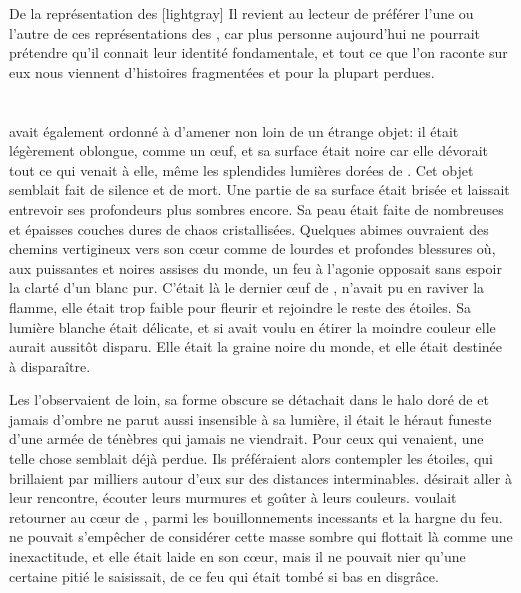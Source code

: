 \begin{paperbox}{De la représentation des \Ea}[lightgray]
Il revient au lecteur de préférer l'une ou l'autre de ces représentations des \Ea, car plus personne aujourd'hui ne pourrait prétendre qu'il connait leur identité fondamentale, et tout ce que l'on raconte sur eux nous viennent d'histoires fragmentées et pour la plupart perdues. 
\end{paperbox}

    

\section{\Orba}

\Cind avait également ordonné à \Carac d'amener non loin de \Naos un étrange objet: il était légèrement oblongue, comme un œuf, et sa surface était noire car elle dévorait tout ce qui venait à elle, même les splendides lumières dorées de \Naos. Cet objet semblait fait de silence et de mort. Une partie de sa surface était brisée et laissait entrevoir ses profondeurs plus sombres encore. Sa peau était faite de nombreuses et épaisses couches dures de chaos cristallisées. %
Quelques abimes ouvraient des chemins vertigineux vers son cœur comme de lourdes et profondes blessures où, aux puissantes et noires assises du monde, un feu à l'agonie opposait sans espoir la clarté d'un blanc pur. C'était là le dernier œuf de \Tot, \Carac n'avait pu en raviver la flamme, elle était trop faible pour fleurir et rejoindre le reste des étoiles. Sa lumière blanche était délicate, et si \Carac avait voulu en étirer la moindre couleur elle aurait aussitôt disparu. Elle était la graine noire du monde, et elle était destinée à disparaître.

Les \Ea l'observaient de loin, sa forme obscure se détachait dans le halo doré de \Naos et jamais d'ombre ne parut aussi insensible à sa lumière, il était le héraut funeste d'une armée de ténèbres qui jamais ne viendrait. Pour ceux qui venaient, une telle chose semblait déjà perdue. Ils préféraient alors contempler les étoiles, qui brillaient par milliers autour d'eux sur des distances interminables. \Nio désirait aller à leur rencontre, écouter leurs murmures et goûter à leurs couleurs. \Fercor voulait retourner au cœur de \Naos, parmi les bouillonnements incessants et la hargne  du feu. \Oros ne pouvait s'empêcher de considérer cette masse sombre qui flottait là comme une inexactitude, et elle était laide en son cœur, mais il ne pouvait nier qu'une certaine pitié le saisissait, de ce feu qui était tombé si bas en disgrâce.


